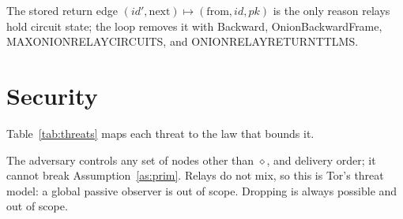 \documentclass[journal]{IEEEtran}
\newcommand{\cl}{\diamond}
\newcommand{\nxt}{\mathrm{next}}
\newcommand{\frm}{\mathrm{from}}
\DeclareRobustCommand{\code}[1]{{\ttfamily\renewcommand{\_}{\textunderscore\allowbreak}#1}}
\begin{document}
The stored return edge $(\mathit{id}',\nxt)\mapsto(\frm,\mathit{id},
\mathit{pk})$ is the only reason relays hold circuit state; the loop
removes it with \code{Backward}, \code{OnionBackwardFrame},
\code{MAX\_ONION\_RELAY\_CIRCUITS}, and \code{ONION\_RELAY\_RETURN\_TTL\_MS}.

\section{Security}\label{sec:security}

Table~\ref{tab:threats} maps each threat to the law that bounds it.

The adversary controls any set of nodes other than $\cl$, and delivery
order; it cannot break Assumption~\ref{as:prim}.  Relays do not mix, so
this is Tor's threat model: a global passive observer is out of scope.  Dropping is always
possible and out of scope.
\end{document}
